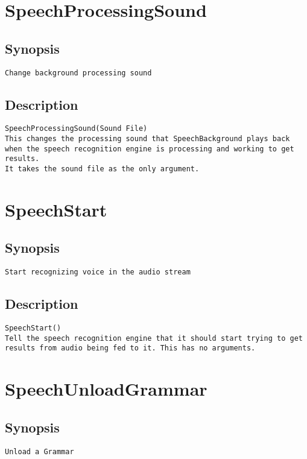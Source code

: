 \section{SpeechProcessingSound}
\subsection{Synopsis}
\begin{verbatim}
Change background processing sound
\end{verbatim}
\subsection{Description}
\begin{verbatim}
SpeechProcessingSound(Sound File)
This changes the processing sound that SpeechBackground plays back when the speech recognition engine is processing and working to get results.
It takes the sound file as the only argument.

\end{verbatim}


\section{SpeechStart}
\subsection{Synopsis}
\begin{verbatim}
Start recognizing voice in the audio stream
\end{verbatim}
\subsection{Description}
\begin{verbatim}
SpeechStart()
Tell the speech recognition engine that it should start trying to get results from audio being fed to it. This has no arguments.

\end{verbatim}


\section{SpeechUnloadGrammar}
\subsection{Synopsis}
\begin{verbatim}
Unload a Grammar
\end{verbatim}
